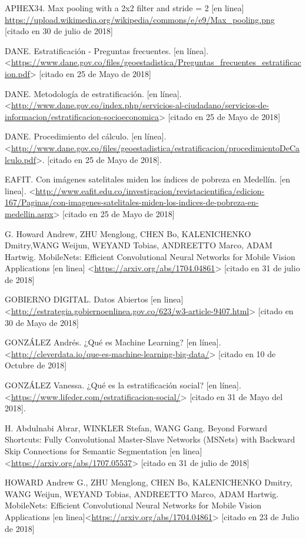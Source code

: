 APHEX34. Max pooling with a 2x2 filter and stride = 2 [en linea] \url{https://upload.wikimedia.org/wikipedia/commons/e/e9/Max_pooling.png} [citado en 30 de julio de 2018]

DANE. Estratificación - Preguntas frecuentes. [en línea]. <\url{https://www.dane.gov.co/files/geoestadistica/Preguntas_frecuentes_estratificacion.pdf}> [citado en 25 de Mayo de 2018]
    
DANE. Metodología de estratificación. [en línea].
 <\url{http://www.dane.gov.co/index.php/servicios-al-ciudadano/servicios-de-informacion/estratificacion-socioeconomica}> [citado en 25 de Mayo de 2018]

DANE. Procedimiento del cálculo. [en línea].
 <\url{http://www.dane.gov.co/files/geoestadistica/estratificacion/procedimientoDeCalculo.pdf}>.
 [citado en 25 de Mayo de 2018].

EAFIT. Con imágenes satelitales miden los índices de pobreza en Medellín. [en linea]. <\url{http://www.eafit.edu.co/investigacion/revistacientifica/edicion-167/Paginas/con-imagenes-satelitales-miden-los-indices-de-pobreza-en-medellin.aspx}> [citado en 25 de Mayo de 2018] 

G. Howard Andrew, ZHU Menglong, CHEN Bo, KALENICHENKO Dmitry,WANG Weijun, WEYAND Tobias, ANDREETTO Marco, ADAM Hartwig. MobileNets: Efficient Convolutional Neural Networks for Mobile Vision Applications [en linea] <\url{https://arxiv.org/abs/1704.04861}> [citado en 31 de julio de 2018] 
 
GOBIERNO DIGITAL. Datos Abiertos [en linea] <\url{http://estrategia.gobiernoenlinea.gov.co/623/w3-article-9407.html}> [citado en 30 de Mayo de 2018] 
 
GONZÁLEZ  Andrés. ¿Qué es Machine Learning? [en línea]. <\url{http://cleverdata.io/que-es-machine-learning-big-data/}> [citado en 10 de Octubre de 2018]

GONZÁLEZ Vanessa. ¿Qué es la estratificación social? [en línea]. <\url{https://www.lifeder.com/estratificacion-social/}> [citado en 31 de Mayo del 2018].

H. Abdulnabi Abrar, WINKLER Stefan, WANG Gang. Beyond Forward Shortcuts: Fully Convolutional Master-Slave Networks (MSNets) with Backward Skip Connections for Semantic Segmentation [en linea] <\url{https://arxiv.org/abs/1707.05537}> [citado en 31 de julio de 2018]

HOWARD Andrew G., ZHU Menglong, CHEN Bo, KALENICHENKO Dmitry, WANG Weijun, WEYAND Tobias, ANDREETTO Marco, ADAM Hartwig. MobileNets: Efficient Convolutional Neural Networks for Mobile Vision Applications [en linea]<\url{https://arxiv.org/abs/1704.04861}> [citado en 23 de Julio de 2018]

